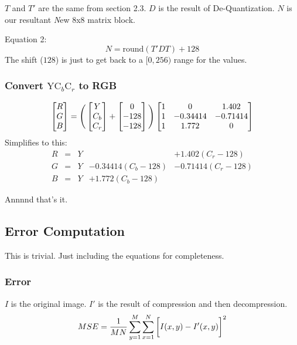 \documentclass{article}
\begin{document}
$T$ and $T'$ are the same from section 2.3.
$D$ is the result of De-Quantization.
$N$ is our resultant \textit{N}ew 8x8 matrix block.

Equation 2:
\[
N = \text{round}(T' D T) + 128
\]
\noindent
The shift ($128$) is just to get back to a $[0,256)$ range for the values.

\subsubsection{Convert $\text{YC}_{b}\text{C}_{r}$ to RGB}
\[
\begin{bmatrix}
R \\
G \\
B

\end{bmatrix}
=
\Bigg{(}
\begin{bmatrix}
Y \\
C_{b} \\
C_{r}
\end{bmatrix}
+
\begin{bmatrix}
0 \\
-128 \\
-128
\end{bmatrix}
\Bigg{)}
\begin{bmatrix}
1 & 0 & 1.402 \\
1 & -0.34414 & -0.71414 \\
1 & 1.772 & 0
\end{bmatrix}
\]
Simplifies to this:
\begin{align*}
R & = & Y & & + 1.402 (C_{r} - 128) \\
G & = & Y & - 0.34414 (C_{b} - 128) & - 0.71414 (C_{r} - 128) \\
B & = & Y & + 1.772 (C_{b} - 128) &
\end{align*}

\noindent
Annnnd that's it.

\subsection{Error Computation}

This is trivial.  Just including the equations for completeness.

\subsubsection{Error}
$I$ is the original image.
$I'$ is the result of compression and then decompression.
\[
MSE = \frac{1}{MN}\sum\limits_{y=1}^{M}\sum\limits_{x=1}^N
\bigg{[}
I(x,y) - I'(x,y)
\bigg{]}^2
\]
\end{document}
